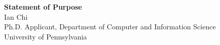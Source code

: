 \documentclass[11pt]{article}
\begin{document}
\begin{center}
    {\Large \textbf{Statement of Purpose}}\\[4pt]
    {\large Ian Chi}\\[2pt]
    Ph.D. Applicant, Department of Computer and Information Science\\
    University of Pennsylvania
\end{center}

\vspace{1em}

\end{document}
